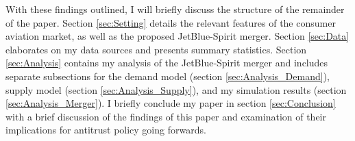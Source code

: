 \documentclass{article}
\begin{document}
    With these findings outlined, I will briefly discuss the structure of the remainder of the paper. Section \ref{sec:Setting} details the relevant features of the consumer aviation market, as well as the proposed JetBlue-Spirit merger. Section \ref{sec:Data} elaborates on my data sources and presents summary statistics. Section \ref{sec:Analysis} contains my analysis of the JetBlue-Spirit merger and includes separate subsections for the demand model (section \ref{sec:Analysis_Demand}), supply model (section \ref{sec:Analysis_Supply}), and my simulation results (section \ref{sec:Analysis_Merger}).  I briefly conclude my paper in section \ref{sec:Conclusion} with a brief discussion of the findings of this paper and examination of their implications for antitrust policy going forwards. 

    
    \pagebreak 
	 
	
\end{document}
